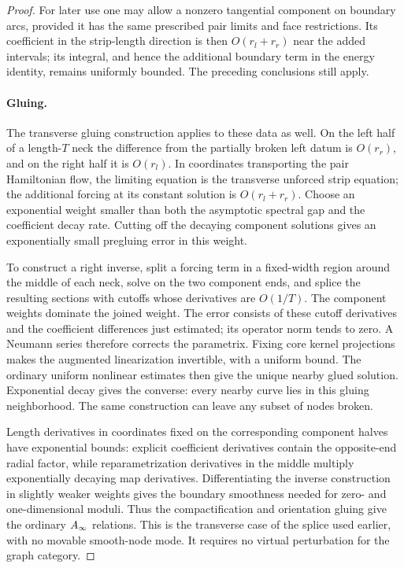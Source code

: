 \begin{proof}
For later use one may allow a nonzero tangential component on boundary
arcs, provided it has the same prescribed pair limits and face
restrictions.  Its coefficient in the strip-length direction is then
\(O(r_l+r_r)\) near the added intervals; its integral, and hence the
additional boundary term in the energy identity, remains uniformly
bounded.  The preceding conclusions still apply.

\paragraph{Gluing.}
The transverse gluing construction applies to these data as well.
On the left half of a length-\(T\) neck the difference from the
partially broken left datum is \(O(r_r)\), and on the right half it is
\(O(r_l)\).  In coordinates transporting the pair Hamiltonian flow,
the limiting equation is the transverse unforced strip equation;
the additional forcing at its constant solution is
\(O(r_l+r_r)\).  Choose an exponential weight smaller than both the
asymptotic spectral gap and the coefficient decay rate.  Cutting off
the decaying component solutions gives an exponentially small
pregluing error in this weight.

To construct a right inverse, split a forcing term in a fixed-width
region around the middle of each neck, solve on the two component
ends, and splice the resulting sections with cutoffs whose derivatives
are \(O(1/T)\).  The component weights dominate the joined weight.
The error consists of these cutoff derivatives and the coefficient
differences just estimated; its operator norm tends to zero.
A Neumann series therefore corrects the parametrix.  Fixing core kernel
projections makes the augmented linearization invertible, with a
uniform bound.  The ordinary uniform nonlinear estimates then give
the unique nearby glued solution.  Exponential decay gives the
converse: every nearby curve lies in this gluing neighborhood.
The same construction can leave any subset of nodes broken.

Length derivatives in coordinates fixed on the corresponding
component halves have exponential bounds: explicit coefficient
derivatives contain the opposite-end radial factor, while
reparametrization derivatives in the middle multiply exponentially
decaying map derivatives.  Differentiating the inverse construction
in slightly weaker weights gives the boundary smoothness needed for
zero- and one-dimensional moduli.  Thus the compactification and
orientation gluing give the ordinary \(A_\infty\) relations.  This is the
transverse case of the splice used earlier, with no movable
smooth-node mode.  It requires no virtual perturbation for the graph
category.


\end{proof}
